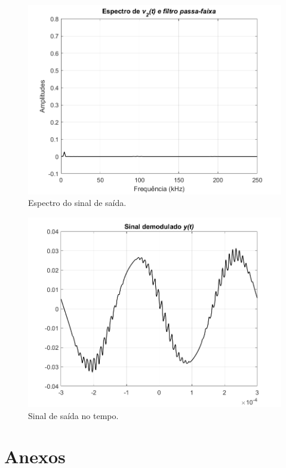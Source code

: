 \documentclass[a4paper,12pt,oneside,openany,table,xcdraw]{article}
\begin{document}
\vspace{0.3cm}
\begin{figure}[H]
\centering
\includegraphics[width=\textwidth]{ex2_espectro_saida_3}
\caption{Espectro do sinal de saída.}
\label{23:3}
\end{figure}

\vspace{0.3cm}
\begin{figure}[H]
\centering
\includegraphics[width=\textwidth]{ex2_saida_3}
\caption{Sinal de saída no tempo.}
\label{23:4}
\end{figure}
 
\newpage
\section{Anexos}
\end{document}
